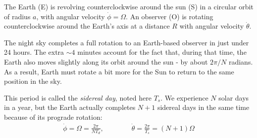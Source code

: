 \documentclass[12pt]{article}
\begin{document}
\begin{figure}
\end{figure}

The Earth (E) is revolving counterclockwise around the sun (S) in a circular 
orbit of radius $a$, with angular velocity $\dot \phi=\Omega$.
An observer (O) is rotating counterclockwise around the Earth's axis at a 
distance $R$ with angular velocity $\dot \theta$.

The night sky completes a full rotation to an Earth-based observer in just 
under 24 hours. The extra $\sim 4$ minutes account for the fact that, during 
that time, the Earth also moves slightly along its orbit around the sun - by
about $2\pi/N$ radians. As a result, Earth must rotate a bit more for the 
Sun to return to the same position in the sky.

This period is called the \textit{sidereal day}, noted here $T_s$. 
We experience $N$ solar days in a year, but the Earth actually completes $N+1$ 
sidereal days in the same time because of its prograde rotation:
\begin{align}
    \dot\phi = \Omega = \frac{2\pi}{N T_d}, \qquad\qquad
    \dot\theta = \frac{2\pi}{T_s} = (N + 1) \Omega
\end{align}
\end{document}
